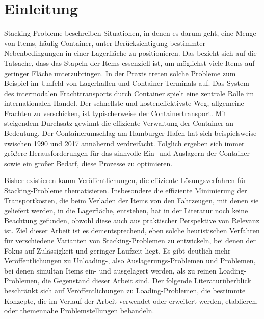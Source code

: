 \section{Einleitung}
\label{sec:einleitung}

Stacking-Probleme beschreiben Situationen, in denen es darum geht, eine Menge von Items, häufig Container,
unter Berücksichtigung bestimmter Nebenbedingungen in einer Lagerfläche zu positionieren. Das 
bezieht sich auf die Tatsache, dass das Stapeln der Items essenziell ist, um möglichst viele Items
auf geringer Fläche unterzubringen. In der Praxis treten solche Probleme zum Beispiel im Umfeld von Lagerhallen und Container-Terminals auf.\newline
Das System des intermodalen Frachttransports durch Container spielt eine zentrale Rolle im internationalen Handel.
Der schnellste und kosteneffektivste Weg, allgemeine Frachten zu verschicken, ist typischerweise der Containertransport. \cite{Briskorn2018}
Mit steigendem Durchsatz gewinnt die effiziente Verwaltung der Container an Bedeutung.
Der Containerumschlag am Hamburger Hafen hat sich beispielsweise zwischen 1990 und 2017 annähernd verdreifacht. \cite{Port_of_Hamburg}
Folglich ergeben sich immer größere Herausforderungen für das sinnvolle Ein- und Auslagern der Container sowie
ein großer Bedarf, diese Prozesse zu optimieren.

Bisher existieren kaum Veröffentlichungen, die effiziente Lösungsverfahren für Stacking-Probleme thematisieren.
Insbesondere die effiziente Minimierung der Transportkosten, die beim Verladen der Items von den Fahrzeugen,
mit denen sie geliefert werden, in die Lagerfläche, entstehen, hat in der Literatur noch keine Beachtung gefunden,
obwohl diese auch aus praktischer Perspektive von Relevanz ist. Ziel dieser Arbeit ist es dementsprechend,
eben solche heuristischen Verfahren für verschiedene Varianten von Stacking-Problemen zu entwickeln, bei denen der Fokus auf
Zulässigkeit und geringer Laufzeit liegt.\newline
Es gibt deutlich mehr Veröffentlichungen zu Unloading-, also Auslagerungs-Problemen und Problemen, bei denen simultan Items
ein- und ausgelagert werden, als zu reinen Loading-Problemen, die Gegenstand dieser Arbeit sind.
Der folgende Literaturüberblick beschränkt sich auf Veröffentlichungen zu Loading-Problemen, die bestimmte Konzepte,
die im Verlauf der Arbeit verwendet oder erweitert werden, etablieren, oder themennahe Problemstellungen behandeln.

